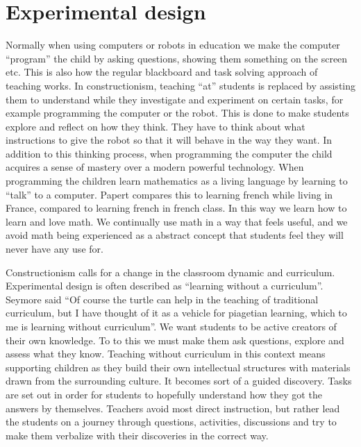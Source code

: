 \section{Experimental design}
Normally when using computers or robots in education we make the computer ``program'' the child by asking questions, showing them something on the screen etc. This is also how the regular blackboard and task solving approach of teaching works. In constructionism, teaching ``at'' students is replaced by assisting them to understand while they investigate and experiment on certain tasks, for example programming the computer or the robot. This is done to make students explore and reflect on how they think. They have to think about what instructions to give the robot so that it will behave in the way they want. In addition to this thinking process, when programming the computer the child acquires a sense of mastery over a modern powerful technology. When programming the children learn mathematics as a living language by learning to ``talk'' to a computer. Papert compares this to learning french while living in France, compared to learning french in french class. In this way we learn how to learn and love math. We continually use math in a way that feels useful, and we avoid math being experienced as a abstract concept that students feel they will never have any use for. 

\bigskip\noindent
Constructionism calls for a change in the classroom dynamic and curriculum. Experimental design is often described as ``learning without a curriculum''. Seymore said ``Of course the turtle can help in the teaching of traditional curriculum, but I have thought of it as a vehicle for piagetian learning, which to me is learning without curriculum''. We want students to be active creators of their own knowledge. To to this we must make them ask questions, explore and assess what they know. Teaching without curriculum in this context means supporting children as they build their own intellectual structures with materials drawn from the surrounding culture. It becomes sort of a guided discovery. Tasks are set out in order for students to hopefully understand how they got the answers by themselves. Teachers avoid most direct instruction, but rather lead the students on a journey through questions, activities, discussions and try to make them verbalize with their discoveries in the correct way.